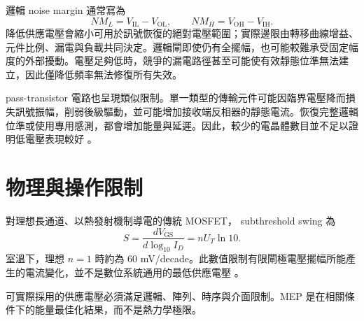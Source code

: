 邏輯 noise margin 通常寫為
\begin{equation}
NM_L=V_{\mathrm{IL}}-V_{\mathrm{OL}},\qquad
NM_H=V_{\mathrm{OH}}-V_{\mathrm{IH}}.
\end{equation}
降低供應電壓會縮小可用於訊號恢復的絕對電壓範圍；實際邊限由轉移曲線增益、元件比例、漏電與負載共同決定。邏輯閘即使仍有全擺幅，也可能較難承受固定幅度的外部擾動。電壓足夠低時，競爭的漏電路徑甚至可能使有效靜態位準無法建立，因此僅降低頻率無法修復所有失效。

 pass-transistor 電路也呈現類似限制。單一類型的傳輸元件可能因臨界電壓降而損失訊號振幅，削弱後級驅動，並可能增加接收端反相器的靜態電流。恢復完整邏輯位準或使用專用感測，都會增加能量與延遲。因此，較少的電晶體數目並不足以證明低電壓表現較好 \cite{chandrakasan1992,markovic2010}。

\section{物理與操作限制}
對理想長通道、以熱發射機制導電的傳統 MOSFET， subthreshold swing 為
\begin{equation}
S=\frac{dV_{\mathrm{GS}}}{d\log_{10}I_D}=nU_T\ln 10.
\end{equation}
室溫下，理想 $n=1$ 時約為 60 mV/decade。此數值限制有限閘極電壓擺幅所能產生的電流變化，並不是數位系統通用的最低供應電壓 \cite{chandrakasan1992}。

可實際採用的供應電壓必須滿足邏輯、陣列、時序與介面限制。MEP 是在相關條件下的能量最佳化結果，而不是熱力學極限。

